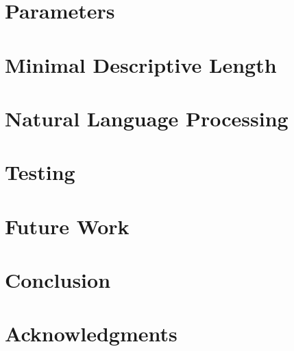\documentclass{acm_proc_article-sp}
\begin{document}
\section{Parameters}


\section{Minimal Descriptive Length}


\section{Natural Language Processing}


\section{Testing}


\section{Future Work}


\section{Conclusion}


\section{Acknowledgments}


%

%
%

\balancecolumns
\end{document}
